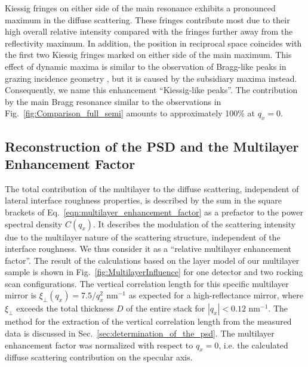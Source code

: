 Kiessig fringes on either side of the main resonance exhibits a pronounced maximum in the diffuse scattering. These fringes contribute most due to their high overall relative 
intensity compared with the fringes further away from the reflectivity maximum. In addition, the position in reciprocal space coincides with the first two Kiessig fringes marked on either side of the main maximum. This effect of dynamic maxima is similar to the observation of Bragg-like peaks in grazing incidence geometry \cite{kaganer_bragg_1995}, but it is caused by the subsidiary maxima instead. Consequently, we name this enhancement ``Kiessig-like peaks''. The contribution by the main Bragg resonance similar to the observations in Fig.~\ref{fig:Comparison_full_semi} amounts to approximately 100\% at $q_x=0$.


\subsection{Reconstruction of the PSD and the Multilayer Enhancement Factor}
\label{sec:multilayer_contribution}
The total contribution of the multilayer to the diffuse scattering, independent of lateral interface roughness properties, is described by the sum in the square brackets of Eq.~\eqref{eqn:multilayer_enhancement_factor} as a prefactor to the power spectral density $C(q_x)$. It describes the modulation of the scattering intensity due to the multilayer nature of the scattering structure, independent of the interface roughness. We thus consider it as a ``relative multilayer enhancement factor''. The result of the calculations based on the layer model of our multilayer sample is shown in Fig.~\ref{fig:MultilayerInfluence} for one detector and two rocking scan configurations. The vertical correlation length for this specific multilayer mirror is $\xi_\perp(q_x)=7.5/q_x^2$ nm$^{-1}$ as expected for a high-reflectance mirror, where $\xi_\perp$ 
exceeds the total thickness $D$ of the entire stack for $|q_x| < 0.12$ nm$^{-1}$. The method for the extraction of the vertical correlation length from the measured data is discussed in Sec.~\ref{sec:determination_of_the_psd}. The multilayer enhancement factor was normalized with respect to $q_x=0$, i.e. the calculated diffuse scattering contribution on the specular axis. 
